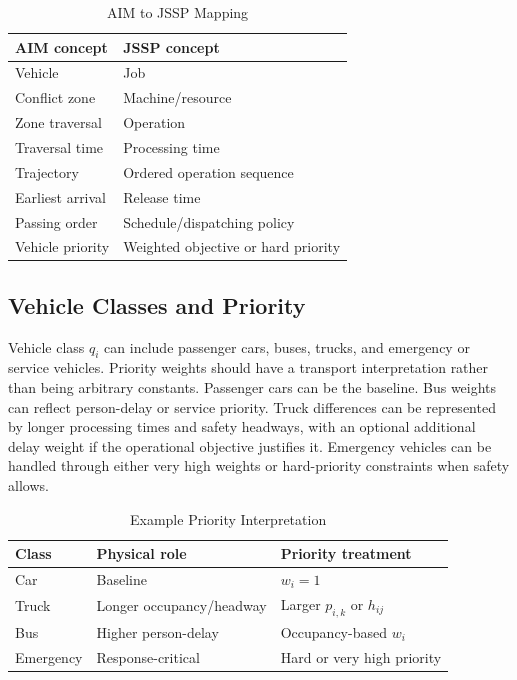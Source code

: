 \begin{table}[t]
\centering
\caption{AIM to JSSP Mapping}
\label{tab:mapping}
\begin{tabular}{ll}
\toprule
AIM concept & JSSP concept \\
\midrule
Vehicle & Job \\
Conflict zone & Machine/resource \\
Zone traversal & Operation \\
Traversal time & Processing time \\
Trajectory & Ordered operation sequence \\
Earliest arrival & Release time \\
Passing order & Schedule/dispatching policy \\
Vehicle priority & Weighted objective or hard priority \\
\bottomrule
\end{tabular}
\end{table}

\subsection{Vehicle Classes and Priority}

Vehicle class $q_i$ can include passenger cars, buses, trucks, and emergency or service vehicles. Priority weights should have a transport interpretation rather than being arbitrary constants. Passenger cars can be the baseline. Bus weights can reflect person-delay or service priority. Truck differences can be represented by longer processing times and safety headways, with an optional additional delay weight if the operational objective justifies it. Emergency vehicles can be handled through either very high weights or hard-priority constraints when safety allows.

\begin{table}[t]
\centering
\caption{Example Priority Interpretation}
\label{tab:priority}
\begin{tabular}{lll}
\toprule
Class & Physical role & Priority treatment \\
\midrule
Car & Baseline & $w_i=1$ \\
Truck & Longer occupancy/headway & Larger $p_{i,k}$ or $h_{ij}$ \\
Bus & Higher person-delay & Occupancy-based $w_i$ \\
Emergency & Response-critical & Hard or very high priority \\
\bottomrule
\end{tabular}
\end{table}


